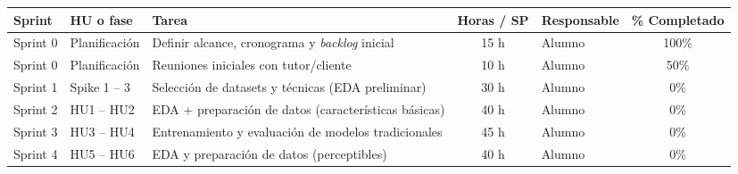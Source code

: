 \documentclass[
11pt, %
]{charter}
\begin{document}

\begin{table}[htpb]
\centering
\begin{tabularx}{\linewidth}{@{}|l|l|X|c|l|c|@{}}
\hline
\rowcolor[HTML]{C0C0C0}
Sprint & HU o fase & Tarea & Horas / SP & Responsable & \% Completado \\ \hline
Sprint 0 & Planificación & Definir alcance, cronograma y \textit{backlog} inicial & 15 h & Alumno & 100\% \\ \hline
Sprint 0 & Planificación & Reuniones iniciales con tutor/cliente & 10 h & Alumno & 50\% \\ \hline
Sprint 1 & Spike 1 – 3 & Selección de datasets y técnicas (EDA preliminar) & 30 h & Alumno & 0\% \\ \hline
Sprint 2 & HU1 – HU2 & EDA + preparación de datos (características básicas) & 40 h & Alumno & 0\% \\ \hline
Sprint 3 & HU3 – HU4 & Entrenamiento y evaluación de modelos tradicionales & 45 h & Alumno & 0\% \\ \hline
Sprint 4 & HU5 – HU6 & EDA y preparación de datos (perceptibles) & 40 h & Alumno & 0\% \\ \hline

\end{tabularx}
\end{table}
\end{document}
